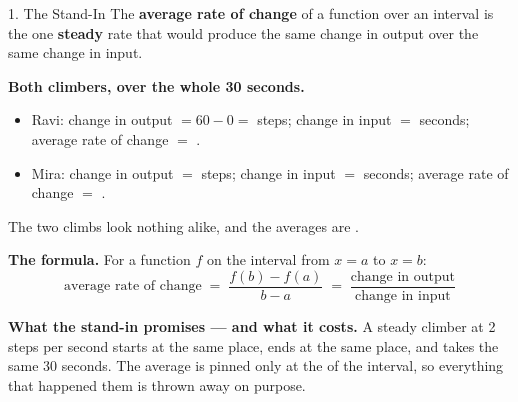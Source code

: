 \documentclass[10pt]{article}
\begin{document}
\boxguard[24]
\begin{notesbox}{1. The Stand-In}
The \textbf{average rate of change} of a function over an interval is the one
\textbf{steady} rate that would produce the same change in output over the
same change in input.

\medskip
\textbf{Both climbers, over the whole 30 seconds.}

\begin{itemize}[itemsep=4pt]
  \item Ravi: change in output $= 60 - 0 = $  steps;
        change in input $=$  seconds; average rate of change
        $=$ .
  \item Mira: change in output $=$  steps; change in input
        $=$  seconds; average rate of change $=$ .
\end{itemize}

The two climbs look nothing alike, and the averages are .

\medskip
\textbf{The formula.} For a function $f$ on the interval from $x = a$ to
$x = b$:
\[
  \text{average rate of change} \;=\; \frac{f(b) - f(a)}{b - a}
  \;=\; \frac{\text{change in output}}{\text{change in input}}
\]

\medskip
\textbf{What the stand-in promises --- and what it costs.} A steady climber at
2 steps per second starts at the same place, ends at the same place, and takes
the same 30 seconds. The average is pinned only at the  of the
interval, so everything that happened  them is thrown away
on purpose.
\end{notesbox}

\vspace{0.1in}
\end{document}
